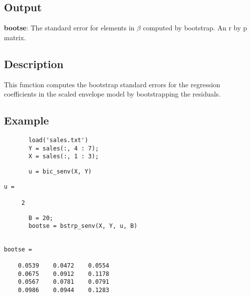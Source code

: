 \documentclass[a4paper,11pt,openany]{memoir}
\begin{document}
\subsection*{Output}

\begin{par}
\textbf{bootse}: The standard error for elements in $\beta$ computed by bootstrap.  An r by p matrix.
\end{par} \vspace{1em}


\subsection*{Description}

\begin{par}
This function computes the bootstrap standard errors for the regression coefficients in the scaled envelope model by bootstrapping the residuals.
\end{par} \vspace{1em}


\subsection*{Example}


\begin{verbatim}       load('sales.txt')
       Y = sales(:, 4 : 7);
       X = sales(:, 1 : 3);\end{verbatim}
    
\begin{verbatim}       u = bic_senv(X, Y)\end{verbatim}
        \color{lightgray}\ttfamily \begin{verbatim}
u =

     2
\end{verbatim} \rmfamily
\color{black}
\begin{verbatim}
       B = 20;
       bootse = bstrp_senv(X, Y, u, B)\end{verbatim}
    
        \color{lightgray}\ttfamily \begin{verbatim}

bootse =

    0.0539    0.0472    0.0554
    0.0675    0.0912    0.1178
    0.0567    0.0781    0.0791
    0.0986    0.0944    0.1283

\end{verbatim} \rmfamily
\color{black}
    

\newpage
\end{document}
